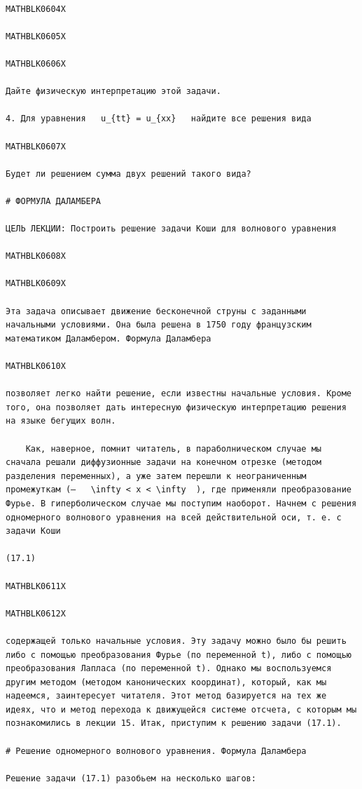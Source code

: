 \documentclass[
]{article}
\begin{document}
\begin{verbatim}

MATHBLK0604X

MATHBLK0605X

MATHBLK0606X

Дайте физическую интерпретацию этой задачи.

4. Для уравнения   u_{tt} = u_{xx}   найдите все решения вида

MATHBLK0607X

Будет ли решением сумма двух решений такого вида?

# ФОРМУЛА ДАЛАМБЕРА

ЦЕЛЬ ЛЕКЦИИ: Построить решение задачи Коши для волнового уравнения

MATHBLK0608X

MATHBLK0609X

Эта задача описывает движение бесконечной струны с заданными начальными условиями. Она была решена в 1750 году французским математиком Даламбером. Формула Даламбера

MATHBLK0610X

позволяет легко найти решение, если известны начальные условия. Кроме того, она позволяет дать интересную физическую интерпретацию решения на языке бегущих волн.

    Как, наверное, помнит читатель, в параболническом случае мы сначала решали диффузионные задачи на конечном отрезке (методом разделения переменных), а уже затем перешли к неограниченным промежуткам (—   \infty < x < \infty  ), где применяли преобразование Фурье. В гиперболическом случае мы поступим наоборот. Начнем с решения одномерного волнового уравнения на всей действительной оси, т. е. с задачи Коши

(17.1)

MATHBLK0611X

MATHBLK0612X

содержащей только начальные условия. Эту задачу можно было бы решить либо с помощью преобразования Фурье (по переменной t), либо с помощью преобразования Лапласа (по переменной t). Однако мы воспользуемся другим методом (методом канонических координат), который, как мы надеемся, заинтересует читателя. Этот метод базируется на тех же идеях, что и метод перехода к движущейся системе отсчета, с которым мы познакомились в лекции 15. Итак, приступим к решению задачи (17.1).

# Решение одномерного волнового уравнения. Формула Даламбера

Решение задачи (17.1) разобьем на несколько шагов:


\end{verbatim}
\end{document}
